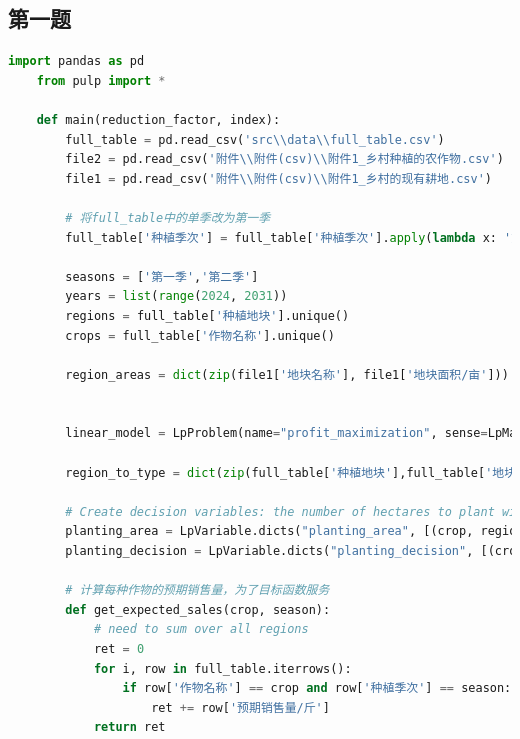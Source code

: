 \documentclass[withoutpreface]{cumcmthesis}
\begin{document}
\newpage
\begin{appendices}
\section{第一题}
\begin{lstlisting}[language=python]
    import pandas as pd
    from pulp import *
    
    def main(reduction_factor, index):
        full_table = pd.read_csv('src\\data\\full_table.csv')
        file2 = pd.read_csv('附件\\附件(csv)\\附件1_乡村种植的农作物.csv')
        file1 = pd.read_csv('附件\\附件(csv)\\附件1_乡村的现有耕地.csv')
    
        # 将full_table中的单季改为第一季
        full_table['种植季次'] = full_table['种植季次'].apply(lambda x: '第一季' if x == '单季' else x)
    
        seasons = ['第一季','第二季']
        years = list(range(2024, 2031))
        regions = full_table['种植地块'].unique()
        crops = full_table['作物名称'].unique()
    
        region_areas = dict(zip(file1['地块名称'], file1['地块面积/亩']))
    
                
        linear_model = LpProblem(name="profit_maximization", sense=LpMaximize)
        
        region_to_type = dict(zip(full_table['种植地块'],full_table['地块类型']))
    
        # Create decision variables: the number of hectares to plant with [each crop] in [each region] at [each year] at [each season] and the decision to plant or not
        planting_area = LpVariable.dicts("planting_area", [(crop, region, year, season) for crop in crops for region in regions for year in years for season in seasons], lowBound=0, cat='Continuous')
        planting_decision = LpVariable.dicts("planting_decision", [(crop, region, year, season) for crop in crops for region in regions for year in years for season in seasons], cat='Binary')
    
        # 计算每种作物的预期销售量，为了目标函数服务
        def get_expected_sales(crop, season):
            # need to sum over all regions
            ret = 0
            for i, row in full_table.iterrows():
                if row['作物名称'] == crop and row['种植季次'] == season:
                    ret += row['预期销售量/斤']
            return ret
    

\end{lstlisting}
\end{appendices}
\end{document}

